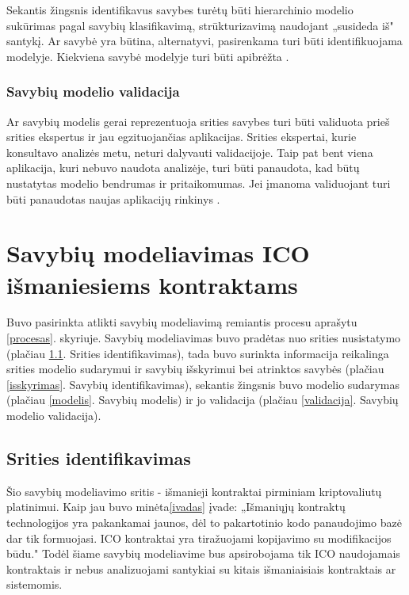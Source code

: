 \documentclass{VUMIFPSkursinis}
\begin{document}
Sekantis žingsnis identifikavus savybes turėtų būti hierarchinio modelio sukūrimas pagal savybių klasifikavimą, strūkturizavimą naudojant „susideda iš" santykį. Ar savybė yra būtina, alternatyvi, pasirenkama turi būti identifikuojama modelyje. Kiekviena savybė modelyje turi būti apibrėžta \cite{Kang1990}.

\subsubsection{Savybių modelio validacija} \label{validacija_teor}

Ar savybių modelis gerai reprezentuoja srities savybes turi būti validuota prieš srities ekspertus ir  jau egzituojančias aplikacijas. Srities ekspertai, kurie konsultavo analizės metu, neturi dalyvauti validacijoje. Taip pat bent viena aplikacija, kuri nebuvo naudota analizėje, turi būti panaudota, kad  būtų nustatytas modelio bendrumas ir pritaikomumas. Jei įmanoma validuojant turi būti panaudotas naujas aplikacijų rinkinys \cite{Kang1990}.
 


\section{Savybių modeliavimas ICO išmaniesiems kontraktams}

Buvo pasirinkta atlikti savybių modeliavimą remiantis procesu aprašytu \ref{procesas}. skyriuje. Savybių modeliavimas buvo pradėtas nuo srities nusistatymo (plačiau \ref{sritis}. Srities identifikavimas), tada buvo surinkta informacija reikalinga srities modelio sudarymui ir savybių išskyrimui bei atrinktos savybės (plačiau \ref{isskyrimas}. Savybių identifikavimas), sekantis žingsnis buvo modelio sudarymas (plačiau \ref{modelis}. Savybių modelis) ir jo validacija (plačiau \ref{validacija}. Savybių modelio validacija).

\subsection{Srities identifikavimas} \label{sritis}

Šio savybių modeliavimo sritis - išmanieji kontraktai pirminiam kriptovaliutų platinimui. Kaip jau buvo minėta\ref{ivadas} įvade: „Išmaniųjų kontraktų technologijos yra pakankamai jaunos, dėl to pakartotinio kodo panaudojimo bazė dar tik formuojasi. ICO kontraktai yra tiražuojami kopijavimo su modifikacijos būdu." Todėl šiame savybių modeliavime bus apsirobojama tik ICO naudojamais kontraktais ir nebus analizuojami santykiai su kitais išmaniaisiais kontraktais ar sistemomis.
\end{document}
